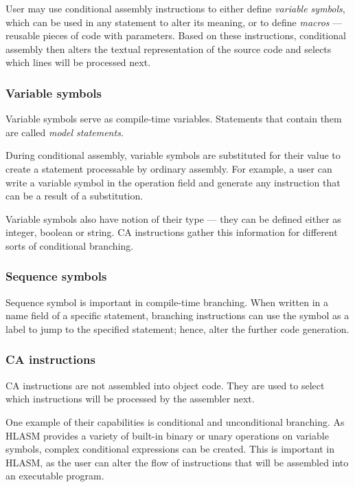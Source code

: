 User may use conditional assembly instructions to either define \emph{variable symbols}, which can be used in any statement to alter its meaning, or to define \emph{macros} --- reusable pieces of code with parameters. Based on these instructions, conditional assembly then alters the textual representation of the source code and selects which lines will be processed next.

\subsubsection{Variable symbols}
\label{var_sym}
Variable symbols serve as compile-time variables. Statements that contain them are called \emph{model statements}.

During conditional assembly, variable symbols are substituted for their value to create a statement processable by ordinary assembly. For example, a user can write a variable symbol in the operation field and generate any instruction that can be a result of a substitution.

Variable symbols also have notion of their type --- they can be defined either as integer, boolean or string. CA instructions gather this information for different sorts of conditional branching.

\subsubsection{Sequence symbols}

Sequence symbol is important in compile-time branching. When written in a name field of a specific statement, branching instructions can use the symbol as a label to jump to the specified statement; hence, alter the further code generation.   

\subsubsection{CA instructions}
\label{ca_instr}

CA instructions are not assembled into object code. They are used to select which instructions will be processed by the assembler next.

One example of their capabilities is conditional and unconditional branching. As HLASM provides a variety of built-in binary or unary operations on variable symbols, complex conditional expressions can be created. This is important in HLASM, as the user can alter the flow of instructions that will be assembled into an executable program.

